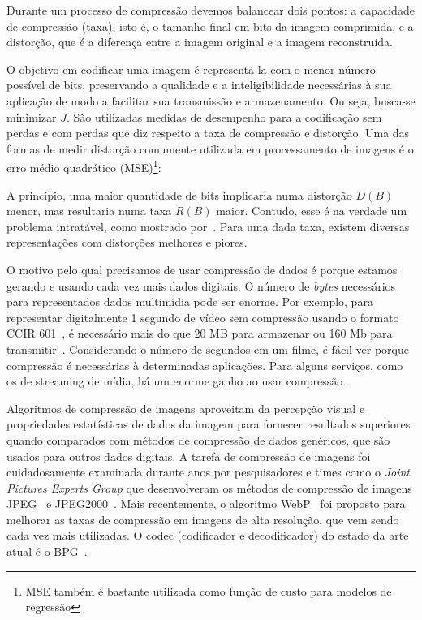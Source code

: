 Durante um processo de compressão devemos balancear dois pontos: a capacidade de compressão (taxa), isto é, o tamanho final em bits da imagem comprimida, e a distorção, que é a diferença entre a imagem original e a imagem reconstruída.

O objetivo em codificar uma imagem é representá-la com o menor número possível de bits, preservando a qualidade e a inteligibilidade necessárias à sua aplicação de modo a facilitar sua transmissão e armazenamento. Ou seja, busca-se minimizar $J$. São utilizadas medidas de desempenho para a codificação sem perdas e com perdas que diz respeito a taxa de compressão e distorção. Uma das formas de medir distorção comumente utilizada em processamento de imagens é o erro médio quadrático (\acrshort{MSE})\footnote{MSE também é bastante utilizada como função de custo para modelos de regressão}: 
    
A princípio, uma maior quantidade de bits implicaria numa distorção $D(B)$ menor, mas resultaria numa taxa $R(B)$ maior. Contudo, esse é na verdade um problema intratável, como mostrado por~\cite{shoham1988}. Para uma dada taxa, existem diversas representações com distorções melhores e piores.

O motivo pelo qual precisamos de usar compressão de dados é porque estamos gerando e usando cada vez mais dados digitais. O número de \textit{bytes} necessários para representados dados multimídia pode ser enorme. Por exemplo, para representar digitalmente 1 segundo de vídeo sem compressão usando o formato CCIR 601~\cite{sayood2017introduction}, é necessário mais do que 20 MB para armazenar ou 160 Mb para transmitir~\cite{sayood2017introduction}. Considerando o número de segundos em um filme, é fácil ver porque compressão é necessárias à determinadas aplicações. Para alguns serviços, como os de streaming de mídia, há um enorme ganho ao usar compressão. 

Algoritmos de compressão de imagens aproveitam da percepção visual e propriedades estatísticas de dados da imagem para fornecer resultados superiores quando comparados com métodos de compressão de dados genéricos, que são usados para outros dados digitais. A tarefa de compressão de imagens foi cuidadosamente examinada durante anos por pesquisadores e times como o \textit{Joint Pictures Experts Group} que desenvolveram os métodos de compressão de imagens JPEG~\cite{jpeg1993} e JPEG2000~\cite{jpeg2000}. Mais recentemente, o algoritmo WebP~\cite{webp} foi proposto para melhorar as taxas de compressão em imagens de alta resolução, que vem sendo cada vez mais utilizadas. O codec (codificador e decodificador) do estado da arte atual é o BPG~\cite{bpg}.

